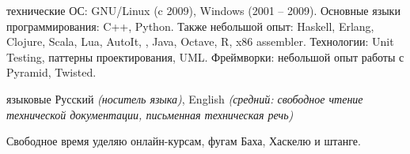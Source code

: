 \documentclass[unicode, 10pt, a4paper, oneside, fleqn]{article}
\begin{document}
\inlineheadsection  %
  {технические}
  {ОС: GNU/Linux (c 2009), Windows (2001 -- 2009).
   Основные языки программирования: C++, Python.
   Также небольшой опыт: Haskell, Erlang, Clojure, Scala, Lua, AutoIt, \CS,
   Java, Octave, R, x86 assembler.
   Технологии: Unit Testing, паттерны проектирования, UML.
   Фреймворки: небольшой опыт работы с Pyramid, Twisted.
  }

\inlineheadsection
  {языковые}
  {Русский \emph{(носитель языка)}, English \emph{(средний: свободное чтение
   технической документации, письменная техническая речь)}}

\spacedhrule{1.6em}{-0.4em}


\inlineheadsection
  {}
  {Свободное время уделяю онлайн-курсам, фугам Баха, Хаскелю и штанге.}
\end{document}
